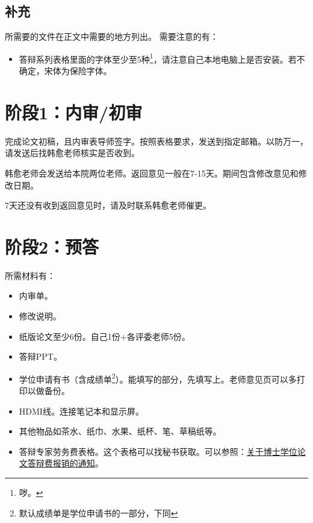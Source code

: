 \documentclass[12pt,a4paper]{ctexart}
\begin{document}
 \subsection{补充}
\label{sec:auc}




所需要的文件在正文中需要的地方列出。
需要注意的有：
\begin{itemize}
\item 答辩系列表格里面的字体至少至5种\footnote{哕。}，请注意自己本地电脑上是否安装。若不确定，宋体为保险字体。
\end{itemize}

\section{阶段1：内审/初审}
\label{sec:rev1}
完成论文初稿，且内审表导师签字。按照表格要求，发送到指定邮箱。以防万一，请发送后找韩愈老师核实是否收到。

韩愈老师会发送给本院两位老师。返回意见一般在7-15天。期间包含修改意见和修改日期。

7天还没有收到返回意见时，请及时联系韩愈老师催更。

\section{阶段2：预答}
\label{sec:prepre}

所需材料有：
\begin{itemize}[label=〇]
\item 内审单。
\item 修改说明。
\item 纸版论文至少6份。自己1份+各评委老师5份。
\item 答辩PPT。
\item 学位申请有书（含成绩单\footnote{默认成绩单是学位申请书的一部分，下同}）。能填写的部分，先填写上。老师意见页可以多打印以做备份。
\item HDMI线。连接笔记本和显示屏。
\item 其他物品如茶水、纸巾、水果、纸杯、笔、草稿纸等。
  \item 答辩专家劳务费表格。这个表格可以找秘书获取。可以参照：\href{https://gs.dlut.edu.cn/info/1211/8758.htm}{关于博士学位论文答辩费报销的通知}。
\end{itemize}
\end{document}
